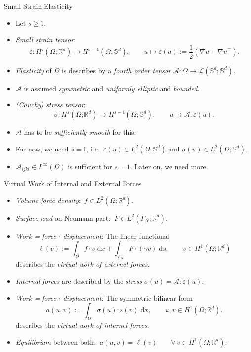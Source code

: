 \documentclass[10pt,aspectratio=169]{beamer}
\def\R{{\mathbb R}}
\def\S{{\mathbb S}}
\def\cA{{\mathcal A}}
\def\cL{{\mathcal L}}
\def\d{{\mathrm{d}}}
\def\dx{{\d x}}
\def\ds{{\d s}}
\begin{document}
\begin{frame}{Small Strain Elasticity}
	\begin{itemize}
		\item Let $s\ge 1$.
		\item {\em Small strain tensor}:
		      \begin{equation*}
			      \varepsilon:H^s(\Omega;\R^d)\to H^{s-1}(\Omega;\S^d),\qquad u\mapsto \varepsilon(u):= \frac{1}{2}\left(\nabla u + \nabla u^\top\right).
		      \end{equation*}

		\item {\em Elasticity} of $\Omega$ is describes by a {\em fourth order tensor} $\cA:\Omega\to\cL(\S^d;\S^d)$.
		\item $\cA$ is assumed {\em symmetric} and {\em uniformly elliptic} and {\em bounded}.
		\item {\em (Cauchy) stress tensor}:
		      \begin{equation*}
			      \sigma: H^s(\Omega;\R^d)\to H^{s-1}(\Omega;\S^d),\qquad u\mapsto \cA : \varepsilon(u).
		      \end{equation*}
		\item $\cA$ has to be {\em sufficiently smooth} for this.
		\item For now, we need $s = 1$, i.e.\ $\varepsilon(u)\in L^2(\Omega;\S^d)$ and $\sigma(u)\in L^2(\Omega;\S^d)$.
		\item $\cA_{ijkl}\in L^\infty(\Omega)$ is sufficient for $s = 1$. Later on, we need more.
	\end{itemize}
\end{frame}

\begin{frame}{Virtual Work of Internal and External Forces}
	\begin{itemize}
		\item {\em Volume force density}: $\ f\in L^2(\Omega;\R^d)$.
		\item {\em Surface load} on Neumann part: $\ F\in L^2(\Gamma_N;\R^d)$.
		\item {\em Work = force $\cdot$ displacement}: The linear functional
		      \begin{equation*}
			      \ell(v)
			      :=
			      \int_\Omega f\cdot v\;\dx
			      +
			      \int_{\Gamma_N} F\cdot (\gamma v)\;\ds,\qquad v\in H^1(\Omega;\R^d)
		      \end{equation*}
		      describes the {\em virtual work of external forces}.
		\item {\em Internal forces} are described by the {\em stress} $\sigma(u) = \cA:\varepsilon(u)$.
		\item {\em Work = force $\cdot$ displacement}: The symmetric bilinear form
		      \begin{equation*}
			      a(u,v)
			      :=
			      \int_\Omega \sigma(u):\varepsilon(v)\;\dx,\qquad u,v\in H^1(\Omega;\R^d).
		      \end{equation*}
		      describes the {\em virtual work of internal forces}.
		\item {\em Equilibrium} between both: $\ a(u,v) = \ell(v)\qquad\forall\,v\in H^1(\Omega;\R^d)$.
	\end{itemize}
\end{frame}
\end{document}
